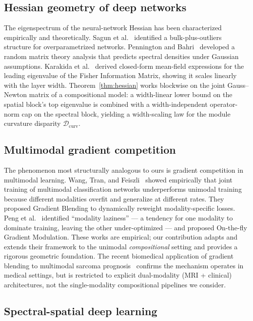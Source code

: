\subsection{Hessian geometry of deep networks}

The eigenspectrum of the neural-network Hessian has been characterized
empirically and theoretically. Sagun et al.~\cite{sagun2017empirical}
identified a bulk-plus-outliers structure for overparametrized
networks. Pennington and Bahri~\cite{pennington2017geometry} developed
a random matrix theory analysis that predicts spectral densities under
Gaussian assumptions. Karakida et al.~\cite{karakida2019universal}
derived closed-form mean-field expressions for the leading eigenvalue
of the Fisher Information Matrix, showing it scales linearly with the
layer width. Theorem~\ref{thm:hessian} works blockwise on the joint
Gauss--Newton matrix of a compositional model: a width-linear lower
bound on the spatial block's top eigenvalue is combined with a
width-independent operator-norm cap on the spectral block, yielding a
width-scaling law for the module curvature disparity
$\mathcal{D}_{\mathrm{curv}}$.

\subsection{Multimodal gradient competition}

The phenomenon most structurally analogous to ours is gradient
competition in multimodal learning. Wang, Tran, and
Feiszli~\cite{wang2020what} showed empirically that joint training of
multimodal classification networks underperforms unimodal training
because different modalities overfit and generalize at different
rates. They proposed Gradient Blending to dynamically reweight
modality-specific losses. Peng et al.~\cite{peng2022balanced}
identified ``modality laziness'' --- a tendency for one modality to
dominate training, leaving the other under-optimized --- and proposed
On-the-fly Gradient Modulation. These works are empirical; our
contribution adapts and extends their framework to the unimodal
\emph{compositional} setting and provides a rigorous geometric
foundation. The recent biomedical application of gradient blending
to multimodal sarcoma prognosis~\cite{bozzo2024multimodal} confirms
the mechanism operates in medical settings, but is restricted to
explicit dual-modality (MRI + clinical) architectures, not the
single-modality compositional pipelines we consider.

\subsection{Spectral-spatial deep learning}


